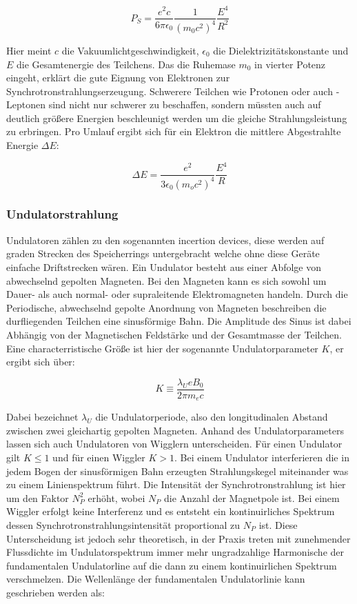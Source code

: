 \begin{equation*}
    P_S = \frac{e^2c}{6\pi \epsilon_0}\frac{1}{(m_0c^2)^4}\frac{E^4}{R^2}
\end{equation*}

Hier meint $c$ die Vakuumlichtgeschwindigkeit, $\epsilon_0$ die Dielektrizitätskonstante 
und $E$ die Gesamtenergie des Teilchens. Das die Ruhemase $m_0$ in vierter Potenz eingeht,
erklärt die gute Eignung von Elektronen zur Synchrotronstrahlungserzeugung. Schwerere 
Teilchen wie Protonen oder auch \tau-Leptonen sind nicht nur schwerer zu beschaffen, sondern
müssten auch auf deutlich größere Energien beschleunigt werden um die gleiche Strahlungsleistung
zu erbringen. Pro Umlauf ergibt sich für ein Elektron die mittlere Abgestrahlte Energie $\Delta E$:

\begin{equation*}
    \Delta E = \frac{e^2}{3\epsilon_0(m_oc^2)^4}\frac{E^4}{R}
\end{equation*}

\subsubsection{Undulatorstrahlung}
\label{sec:Undulatorstrahlung}
Undulatoren zählen zu den sogenannten incertion devices, diese werden auf graden Strecken des 
Speicherrings untergebracht welche ohne diese Geräte einfache Driftstrecken wären. Ein Undulator besteht
aus einer Abfolge von abwechselnd gepolten Magneten. Bei den Magneten kann es sich sowohl um Dauer- als
auch normal- oder supraleitende Elektromagneten handeln. Durch die Periodische, abwechselnd gepolte 
Anordnung von Magneten beschreiben die durfliegenden Teilchen eine sinusförmige Bahn. Die Amplitude des 
Sinus ist dabei Abhängig von der Magnetischen Feldstärke und der Gesamtmasse der Teilchen. Eine 
characterristische Größe ist hier der sogenannte Undulatorparameter $K$, er ergibt sich über:

\begin{equation*}
    K \equiv \frac{\lambda_U e B_0}{2 \pi m_e c}
\end{equation*}

Dabei bezeichnet $\lambda_U$ die Undulatorperiode, also den longitudinalen Abstand zwischen zwei 
gleichartig gepolten Magneten. Anhand des Undulatorparameters lassen sich auch Undulatoren von Wigglern
unterscheiden. Für einen Undulator gilt $K \leq 1$ und für einen Wiggler $K > 1$. Bei einem Undulator 
interferieren die in jedem Bogen der sinusförmigen Bahn erzeugten Strahlungskegel miteinander was zu
einem Linienspektrum führt. Die Intensität der Synchrotronstrahlung ist hier um den Faktor $N_P^2$ 
erhöht, wobei $N_P$ die Anzahl der Magnetpole ist. Bei einem Wiggler erfolgt keine Interferenz und 
es entsteht ein kontinuirliches Spektrum dessen Synchrotronstrahlungsintensität proportional zu $N_P$ ist.
Diese Unterscheidung ist jedoch sehr theoretisch, in der Praxis treten mit zunehmender Flussdichte im 
Undulatorspektrum immer mehr ungradzahlige Harmonische der fundamentalen Undulatorline auf die dann zu 
einem kontinuirlichen Spektrum verschmelzen. Die Wellenlänge der fundamentalen Undulatorlinie kann 
geschrieben werden als:

